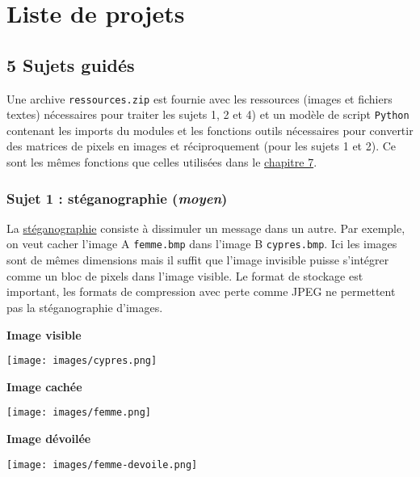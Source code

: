 \documentclass[a4paper, french, 12pt]{article}  %
\begin{document}
 


\section{Liste de projets}


\subsection{5 Sujets  guidés}


Une archive \texttt{ressources.zip} est fournie avec les ressources (images et fichiers textes) nécessaires pour traiter les sujets 1, 2 et 4)  et un  modèle de script \texttt{Python} contenant les imports du modules et les fonctions outils nécessaires pour convertir des matrices de pixels en images et réciproquement (pour les sujets 1 et 2). Ce sont les mêmes fonctions que celles utilisées dans le \href{https://parc-nsi.github.io/premiere-nsi/chapitre7.html}{chapitre 7}.


\subsubsection{Sujet 1 : stéganographie (\textit{moyen})}


La \href{https://fr.wikipedia.org/wiki/St\%C3\%A9ganographie}{stéganographie} consiste à dissimuler un message dans un autre. Par exemple, on veut cacher l'image A \texttt{femme.bmp} dans l'image B \texttt{cypres.bmp}. Ici les images sont de mêmes dimensions mais il suffit que l'image invisible puisse s'intégrer comme un bloc de pixels dans l'image visible. Le format de stockage est important, les formats de compression avec perte comme JPEG ne permettent pas la stéganographie d'images. 

\begin{minipage}{0.3\linewidth}
\begin{center}
\textbf{Image visible}

\texttt{[image: images/cypres.png]}
\end{center}
\end{minipage}\hfill
\begin{minipage}{0.3\linewidth}
\begin{center}
\textbf{Image cachée}

\texttt{[image: images/femme.png]}
\end{center}
\end{minipage}\hfill
\hfill
\begin{minipage}{0.3\linewidth}
\begin{center}
\textbf{Image dévoilée}

\texttt{[image: images/femme-devoile.png]}
\end{center}
\end{minipage}
\end{document}
